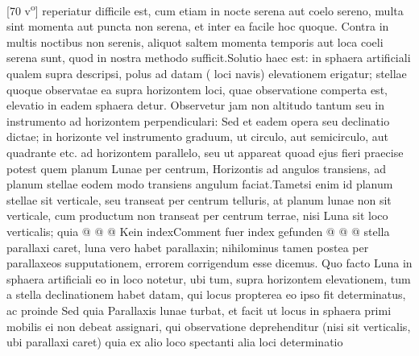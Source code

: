 [70 v\textsuperscript{o}] reperiatur difficile est, cum etiam in nocte serena aut coelo sereno, multa sint momenta aut puncta non serena, et inter ea facile hoc quoque. Contra in multis noctibus non serenis, aliquot saltem momenta temporis aut loca coeli serena  sunt, quod in nostra methodo sufficit.\pend \pstart Solutio haec est: in sphaera artificiali qualem supra descripsi, polus\protect{} ad datam ( loci navis\protect{})  elevationem erigatur; stellae\protect{} quoque observatae ea supra horizontem loci, quae observatione comperta est, elevatio in eadem sphaera detur. Observetur jam \protect{} non altitudo tantum seu  in instrumento ad horizontem perpendiculari: Sed et eadem opera  seu declinatio\protect{} \protect{} \protect{} dictae; in horizonte vel instrumento graduum, ut circulo, aut semicirculo, aut quadrante etc. ad horizontem parallelo, seu ut appareat quoad ejus fieri praecise potest quem planum Lunae\protect{} per centrum, Horizontis ad angulos  transiens, ad planum stellae\protect{} eodem modo transiens angulum faciat.\pend \pstart Tametsi enim id planum stellae\protect{} sit verticale, seu transeat per centrum telluris\protect{}, at planum lunae\protect{} non sit verticale, cum productum non transeat per centrum terrae, nisi Luna\protect{} sit loco verticalis; quia  @ @ @ Kein indexComment fuer index gefunden @ @ @ stella parallaxi\protect{} caret, luna\protect{} vero habet parallaxin\protect{}; nihilominus tamen postea per parallaxeos\protect{} supputationem, errorem corrigendum esse dicemus. Quo facto Luna\protect{} in sphaera artificiali eo in loco notetur, ubi tum, supra horizontem elevationem, tum a stella declinationem\protect{} habet datam, qui locus propterea eo ipso fit determinatus, ac proinde \protect{}\textso{ }\protect{}\pend \pstart Sed quia Parallaxis\protect{} lunae\protect{} turbat, et facit ut locus in sphaera primi mobilis ei non  debeat assignari, qui observatione deprehenditur (nisi  sit  verticalis, ubi parallaxi\protect{} caret) quia ex alio loco spectanti alia loci determinatio 